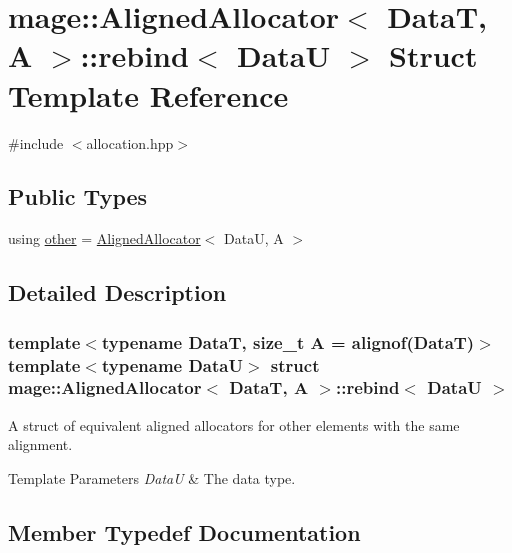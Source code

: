 \hypertarget{structmage_1_1_aligned_allocator_1_1rebind}{}\section{mage\+:\+:Aligned\+Allocator$<$ DataT, A $>$\+:\+:rebind$<$ DataU $>$ Struct Template Reference}
\label{structmage_1_1_aligned_allocator_1_1rebind}


{\ttfamily \#include $<$allocation.\+hpp$>$}

\subsection*{Public Types}
\begin{DoxyCompactItemize}
\item 
using \mbox{\hyperlink{structmage_1_1_aligned_allocator_1_1rebind_a61200e3d00bab815566641db0f33b3d3}{other}} = \mbox{\hyperlink{classmage_1_1_aligned_allocator}{Aligned\+Allocator}}$<$ DataU, A $>$
\end{DoxyCompactItemize}


\subsection{Detailed Description}
\subsubsection*{template$<$typename DataT, size\+\_\+t A = alignof(\+Data\+T)$>$\newline
template$<$typename DataU$>$\newline
struct mage\+::\+Aligned\+Allocator$<$ Data\+T, A $>$\+::rebind$<$ Data\+U $>$}

A struct of equivalent aligned allocators for other elements with the same alignment.


\begin{DoxyTemplParams}{Template Parameters}
{\em DataU} & The data type. \\
\hline
\end{DoxyTemplParams}


\subsection{Member Typedef Documentation}
\mbox{\label{structmage_1_1_aligned_allocator_1_1rebind_a61200e3d00bab815566641db0f33b3d3}} 
